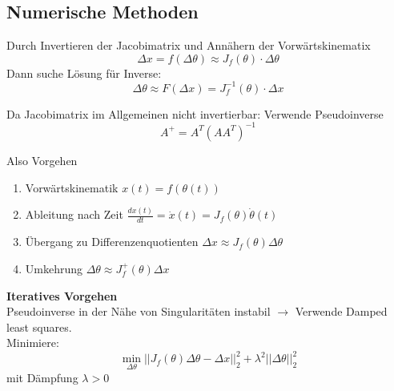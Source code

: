 \subsection{Numerische Methoden}%
\label{ik:sub:numerische-methoden}
Durch Invertieren der Jacobimatrix und Annähern der Vorwärtskinematix
\[\Delta x = f(\Delta \theta) \approx J_f(\theta) \cdot \Delta \theta\]
Dann suche Lösung für Inverse:
\[\Delta \theta \approx F(\Delta x) = J_f^{-1}(\theta) \cdot \Delta x\]

Da Jacobimatrix im Allgemeinen nicht invertierbar: Verwende Pseudoinverse
\[A^+ = A^T{(AA^T)}^{-1}\]

Also Vorgehen
\begin{enumerate}
\item Vorwärtskinematik \(x(t) = f(\theta(t))\)
\item Ableitung nach Zeit \(\frac{dx(t)}{dt} = \dot{x}(t) = J_f(\theta)\dot{\theta}(t)\)
\item Übergang zu Differenzenquotienten \(\Delta x \approx J_f(\theta)\Delta\theta\)
\item Umkehrung \(\Delta\theta \approx J_f^+(\theta)\Delta x\)
\end{enumerate}

\textbf{Iteratives Vorgehen}\\
Pseudoinverse in der Nähe von Singularitäten instabil \(\rightarrow\) Verwende Damped least squares.\\
Minimiere:
\[\min_{\Delta\theta}||J_f(\theta)\Delta\theta - \Delta x||^2_2 + \lambda^2||\Delta\theta||^2_2\]
mit Dämpfung \(\lambda > 0\)